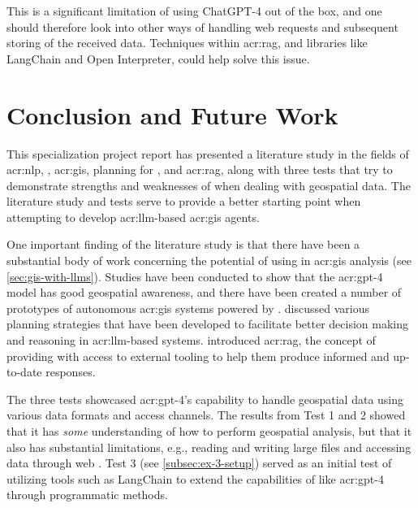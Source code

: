 This is a significant limitation of using ChatGPT-4 out of the box, and one should therefore look into other ways of handling web requests and subsequent storing of the received data. Techniques within \gls{acr:rag}, and libraries like LangChain and Open Interpreter, could help solve this issue.

\glsresetall

\section{Conclusion and Future Work}\label{sec:conclusion-and-future-work}

This specialization project report has presented a literature study in the fields of \acrlong{acr:nlp}, , \acrshort{acr:gis}, planning for , and \acrlong{acr:rag}, along with three tests that try to demonstrate strengths and weaknesses of  when dealing with geospatial data. The literature study and tests serve to provide a better starting point when attempting to develop \acrshort{acr:llm}-based \acrshort{acr:gis} agents.

One important finding of the literature study is that there have been a substantial body of work concerning the potential of using  in \acrshort{acr:gis} analysis (see \autoref{sec:gis-with-llms}). Studies have been conducted to show that the \acrshort{acr:gpt}-4 model has good geospatial awareness, and there have been created a number of prototypes of autonomous \acrshort{acr:gis} systems powered by .  discussed various planning strategies that have been developed to facilitate better decision making and reasoning in \acrshort{acr:llm}-based systems.  introduced \gls{acr:rag}, the concept of providing  with access to external tooling to help them produce informed and up-to-date responses.

The three tests showcased \acrshort{acr:gpt}-4's capability to handle geospatial data using various data formats and access channels. The results from Test 1 and 2 showed that it has \textit{some} understanding of how to perform geospatial analysis, but that it also has substantial limitations, e.g., reading and writing large files and accessing data through web . Test 3 (see \autoref{subsec:ex-3-setup}) served as an initial test of utilizing tools such as LangChain to extend the capabilities of  like \acrshort{acr:gpt}-4 through programmatic methods.

